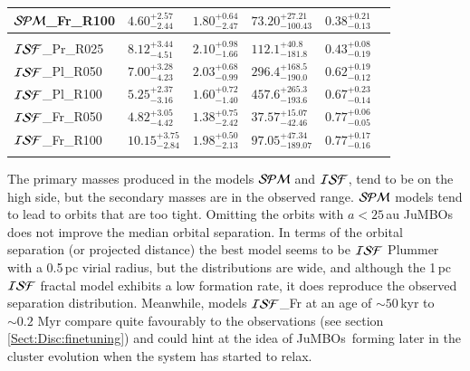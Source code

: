 \documentclass[submission,phys]{lib/SciPost}
\newcommand{\jumbos}{\mbox{JuMBOs}}
\begin{document}
\begin{table}
\begin{tabular}{llllll}
 ${\cal SPM}$\_Fr\_R100 & $4.60^{+2.57}_{-2.44}$ & $1.80^{+0.64}_{-2.47}$ & $73.20^{+27.21}_{-100.43}$ & $0.38^{+0.21}_{-0.13}$ \vspace{0.25em}\\
 \hline \vspace{-0.75em} \\ 
 ${\cal ISF}$\_Pr\_R025 & $8.12^{+3.44}_{-4.51}$ & $2.10^{+0.98}_{-1.66}$ & $112.1^{+40.8}_{-181.8}$ & $0.43^{+0.08}_{-0.19}$ \vspace{0.25em}\\
 ${\cal ISF}$\_Pl\_R050 & $7.00^{+3.28}_{-4.23}$ & $2.03^{+0.68}_{-0.99}$ & $296.4^{+168.5}_{-190.0}$ & $0.62^{+0.19}_{-0.12}$ \vspace{0.25em}\\
 ${\cal ISF}$\_Pl\_R100 & $5.25^{+2.37}_{-3.16}$ & $1.60^{+0.72}_{-1.40}$ & $457.6^{+265.3}_{-193.6}$ & $0.67^{+0.23}_{-0.14}$ \vspace{0.25em}\\
 ${\cal ISF}$\_Fr\_R050 & $4.82^{+3.05}_{-4.42}$ & $1.38^{+0.75}_{-2.42}$ & $37.57^{+15.07}_{-42.46}$ & $0.77^{+0.06}_{-0.05}$ \vspace{0.25em}\\  
 ${\cal ISF}$\_Fr\_R100 &$10.15^{+3.75}_{-2.84}$ & $1.98^{+0.50}_{-2.13}$ & $97.05^{+47.34}_{-189.07}$ & $0.77^{+0.17}_{-0.16}$ \vspace{0.25em}\\
 \hline \vspace{-0.75em} \\ 
 \end{tabular}
\end{table}

The primary masses produced in the models ${\cal SPM}$ and ${\cal
  ISF}$, tend to be on the high side, but the secondary masses are in
the observed range. ${\cal SPM}$ models tend to lead to orbits that
are too tight. Omitting the orbits with $a<25$\,au \jumbos\, does not
improve the median orbital separation.  In terms of the orbital
separation (or projected distance) the best model seems to be ${\cal
  ISF}$ Plummer with a 0.5\,pc virial radius, but the distributions
are wide, and although the 1\,pc ${\cal ISF}$ fractal model exhibits a
low formation rate, it does reproduce the observed separation
distribution. Meanwhile, models ${\cal ISF}$\_Fr at an age of
$\sim50$\,kyr to $\sim0.2$ Myr compare quite favourably to the
observations (see section\,\ref{Sect:Disc:finetuning}) and could hint
at the idea of \jumbos\ forming later in the cluster evolution when
the system has started to relax.
\end{document}
